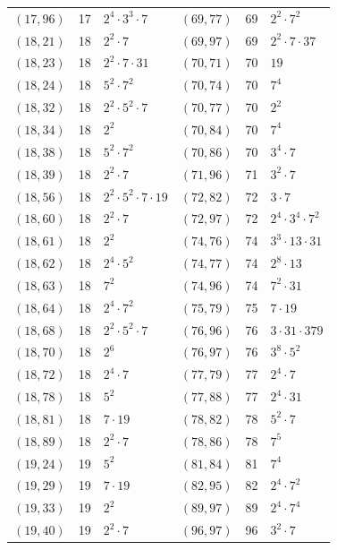 \documentclass[11pt]{article}
\begin{document}
\begin{longtable}{@{}lrl@{\qquad}lrl@{}}
$(17,96)$ & 17 & $2^{4}\cdot 3^{3}\cdot 7$ & $(69,77)$ & 69 & $2^{2}\cdot 7^{2}$\\
$(18,21)$ & 18 & $2^{2}\cdot 7$ & $(69,97)$ & 69 & $2^{2}\cdot 7\cdot 37$\\
$(18,23)$ & 18 & $2^{2}\cdot 7\cdot 31$ & $(70,71)$ & 70 & $19$\\
$(18,24)$ & 18 & $5^{2}\cdot 7^{2}$ & $(70,74)$ & 70 & $7^{4}$\\
$(18,32)$ & 18 & $2^{2}\cdot 5^{2}\cdot 7$ & $(70,77)$ & 70 & $2^{2}$\\
$(18,34)$ & 18 & $2^{2}$ & $(70,84)$ & 70 & $7^{4}$\\
$(18,38)$ & 18 & $5^{2}\cdot 7^{2}$ & $(70,86)$ & 70 & $3^{4}\cdot 7$\\
$(18,39)$ & 18 & $2^{2}\cdot 7$ & $(71,96)$ & 71 & $3^{2}\cdot 7$\\
$(18,56)$ & 18 & $2^{2}\cdot 5^{2}\cdot 7\cdot 19$ & $(72,82)$ & 72 & $3\cdot 7$\\
$(18,60)$ & 18 & $2^{2}\cdot 7$ & $(72,97)$ & 72 & $2^{4}\cdot 3^{4}\cdot 7^{2}$\\
$(18,61)$ & 18 & $2^{2}$ & $(74,76)$ & 74 & $3^{3}\cdot 13\cdot 31$\\
$(18,62)$ & 18 & $2^{4}\cdot 5^{2}$ & $(74,77)$ & 74 & $2^{8}\cdot 13$\\
$(18,63)$ & 18 & $7^{2}$ & $(74,96)$ & 74 & $7^{2}\cdot 31$\\
$(18,64)$ & 18 & $2^{4}\cdot 7^{2}$ & $(75,79)$ & 75 & $7\cdot 19$\\
$(18,68)$ & 18 & $2^{2}\cdot 5^{2}\cdot 7$ & $(76,96)$ & 76 & $3\cdot 31\cdot 379$\\
$(18,70)$ & 18 & $2^{6}$ & $(76,97)$ & 76 & $3^{8}\cdot 5^{2}$\\
$(18,72)$ & 18 & $2^{4}\cdot 7$ & $(77,79)$ & 77 & $2^{4}\cdot 7$\\
$(18,78)$ & 18 & $5^{2}$ & $(77,88)$ & 77 & $2^{4}\cdot 31$\\
$(18,81)$ & 18 & $7\cdot 19$ & $(78,82)$ & 78 & $5^{2}\cdot 7$\\
$(18,89)$ & 18 & $2^{2}\cdot 7$ & $(78,86)$ & 78 & $7^{5}$\\
$(19,24)$ & 19 & $5^{2}$ & $(81,84)$ & 81 & $7^{4}$\\
$(19,29)$ & 19 & $7\cdot 19$ & $(82,95)$ & 82 & $2^{4}\cdot 7^{2}$\\
$(19,33)$ & 19 & $2^{2}$ & $(89,97)$ & 89 & $2^{4}\cdot 7^{4}$\\
$(19,40)$ & 19 & $2^{2}\cdot 7$ & $(96,97)$ & 96 & $3^{2}\cdot 7$\\
\end{longtable}
\endgroup
\end{document}
